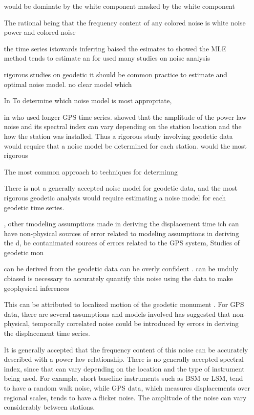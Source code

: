 \documentclass[10pt,a4paper]{article}
\begin{document}
   

would be dominate by the white component  masked by the white component   

The rational being that the frequency content of any colored noise is    white noise power and colored noise 

the time series istowards inferring  baised  the esimates to  showed the MLE method tends to estimate an     
 for used many studies on noise analysis    


  rigorous studies on geodetic  it should be common practice to estimate and optimal noise model.  no clear model which 

In To determine which noise model is most appropriate,     

in  who used longer GPS time series.  \citet{Langbein2008} showed that the amplitude of the power law noise and its spectral index can vary depending on the station location and the how the station was installed. Thus a rigorous study involving geodetic data would require that a noise model be determined for each station.  would    the most rigorous      

The most common approach to techniques for determinng  


There is not a generally accepted noise model for geodetic data, and the most rigorous geodetic analysis would require estimating a noise model for each geodetic time series.  

    ,  other tmodeling assumptions made in deriving the displacement time ich can have non-physical sources of error related to modeling assumptions in deriving the d,  be contanimated sources of errors  related to the GPS system,            Studies of geodetic mon  


can be derived from the geodetic data can be overly confident \citep[e.g][]{Mao1999}.  can be unduly cbiased  is necessary to accurately quantify this noise using the data to make geophysical inferences 


This can be attributed to localized motion of the geodetic monument \citep[e.g.][]{Wyatt1982,Wyatt1989,Agnew1992,King2009}. For GPS data, there are several assumptions and models involved  \citet{Langbeing2008,Langbein2012} has suggested that non-physical, temporally correlated noise could be introduced by errors in deriving the displacement time series.  

It is generally accepted that the frequency content of this noise can be accurately described with a power law relationship.  There is no generally accepted spectral index, since that can vary depending on the location and the type of instrument being used.  For example, short baseline instruments such as BSM or LSM, tend to have a random walk noise, while GPS data, which measures displacements over regional scales, tends to have a flicker noise.  The amplitude of the noise can vary considerably between stations. 
\end{document}
